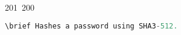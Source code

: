 201~200~\documentclass{article}
\begin{document}
\begin{lstlisting}[language=Python, caption=Server Password Hashing with SHA3-512]
	                                                                                                                                                                                                                                                                                                	                                                                                                                                        	    	                                                                                                	                                                                                                                                                                                                                                                                                                                                	                                                                        	                                                                        	                                                                                                                                        	                                                                                                \brief Hashes a password using SHA3-512.
	                                                                                                                                                                                                                                                                                                	                                                                                                                                        	    	                                                                                                	                                                                                                                                                                                                                                                                                                                                	                                                                        	                                                                        	                                                                                                                                        	                                                                                                    \param password The password to hash.

\end{lstlisting}
\end{document}

